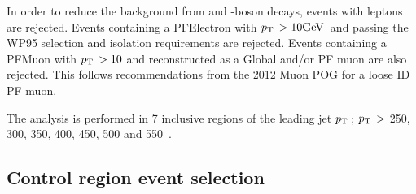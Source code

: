 In order to reduce the background from \Z and \W-boson decays, events
with leptons are rejected.
Events containing a PFElectron with $p_{\text{T}}\,> 10\mathrm{GeV}\,$ and passing the WP95 selection and isolation requirements are rejected. 
Events containing a PFMuon with $p_{\text{T}}\, > 10$ \GeV and reconstructed as a Global and/or PF muon are also rejected. This follows recommendations from the 2012 Muon POG for a loose ID PF muon. 


The analysis is performed in 7 inclusive regions of the leading jet $p_{\text{T}}\,$; $p_{\text{T}}\, >$ 250, 300, 350, 400, 450, 500 and 550~\GeV.

\subsection{Control region event selection}

